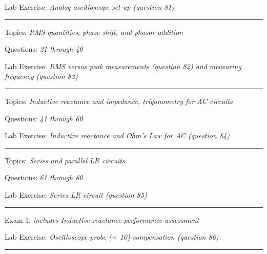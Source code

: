\hskip 10pt Lab Exercise: {\it Analog oscilloscope set-up (question 81)}
 


\vskip 10pt
\hrule \vskip 5pt
\noindent
{}

\hskip 10pt Topics: {\it RMS quantities, phase shift, and phasor addition}
 
\hskip 10pt Questions: {\it 21 through 40}
 
\hskip 10pt Lab Exercise: {\it RMS versus peak measurements (question 82) and measuring frequency (question 83)}
 


\vskip 10pt
\hrule \vskip 5pt
\noindent
{}

\hskip 10pt Topics: {\it Inductive reactance and impedance, trigonometry for AC circuits}
 
\hskip 10pt Questions: {\it 41 through 60}
 
\hskip 10pt Lab Exercise: {\it Inductive reactance and Ohm's Law for AC (question 84)}
 

\vskip 10pt
\hrule \vskip 5pt
\noindent
{}

\hskip 10pt Topics: {\it Series and parallel LR circuits}
 
\hskip 10pt Questions: {\it 61 through 80}
 
\hskip 10pt Lab Exercise: {\it Series LR circuit (question 85)}
 
\vskip 10pt
\hrule \vskip 5pt
\noindent
{}

\hskip 10pt Exam 1: {\it includes Inductive reactance performance assessment}
 
\hskip 10pt Lab Exercise: {\it Oscilloscope probe ($\times$ 10) compensation (question 86)}

\vskip 10pt
\hrule \vskip 5pt
\noindent
{}

